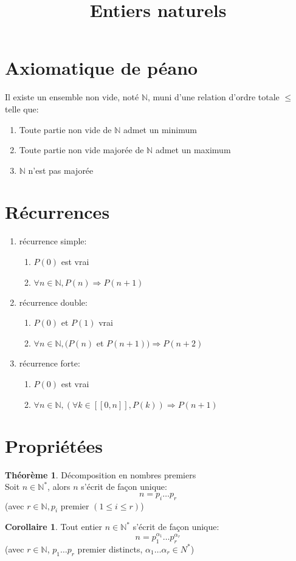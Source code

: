 \documentclass[fleqn]{article}
\title{Entiers naturels}
\date{}
\theoremstyle{definition} \newtheorem*{defi}{D\'efinition}
\theoremstyle{definition} \newtheorem*{theo}{Th\'eor\`eme}
\theoremstyle{definition} \newtheorem*{coro}{Corollaire}
\theoremstyle{remark} \newtheorem*{rqs}{Remarques}
\theoremstyle{definition} \newtheorem*{prop}{Propri\'et\'e}
\begin{document}
\maketitle

\section{Axiomatique de p\'eano}
Il existe un ensemble non vide, not\'e $\mathbb{N}$, muni d'une relation d'ordre totale $\leq$ telle que:
\begin{enumerate}
	\item Toute partie non vide de $\mathbb{N}$ admet un minimum
	\item Toute partie non vide major\'ee de $\mathbb{N}$ admet un maximum
	\item $\mathbb{N}$ n'est pas major\'ee
\end{enumerate}

\section{R\'ecurrences}
\begin{enumerate}
	\item r\'ecurrence simple:
		\begin{enumerate}
			\item $P(0)$ est vrai
			\item $\forall n \in \mathbb{N}, P(n) \Rightarrow P(n+1)$
		\end{enumerate}
	\item r\'ecurrence double:
		\begin{enumerate}
			\item $P(0)$ et $P(1)$ vrai
			\item $\forall n \in \mathbb{N}, (P(n)$ et $P(n+1)) \Rightarrow P(n+2)$
		\end{enumerate}
	\item r\'ecurrence forte:
		\begin{enumerate}
			\item $P(0)$ est vrai
			\item $\forall n \in \mathbb{N}, (\forall k \in [\![0,n]\!], P(k)) \Rightarrow P(n+1)$
		\end{enumerate}
\end{enumerate}

\section{Propri\'et\'ees}
\begin{theo} D\'ecomposition en nombres premiers \\
		Soit $n \in \mathbb{N}^*$, alors $n$ s'\'ecrit de fa\c{c}on unique:
		\[n = p_i \ldots p_r\] (avec $r \in \mathbb{N}, p_i$ premier $(1 \leq i \leq r)$)
\end{theo}
\begin{coro}
	Tout entier $n \in \mathbb{N}^*$ s'\'ecrit de fa\c{c}on unique:
	\[n = p_1^{\alpha_1} \ldots p_r^{\alpha_r}\] (avec $r \in \mathbb{N}$,
	$p_1 \ldots p_r$ premier distincts, $\alpha_1 \ldots \alpha_r \in {N}^*$)
\end{coro}
\end{document}
